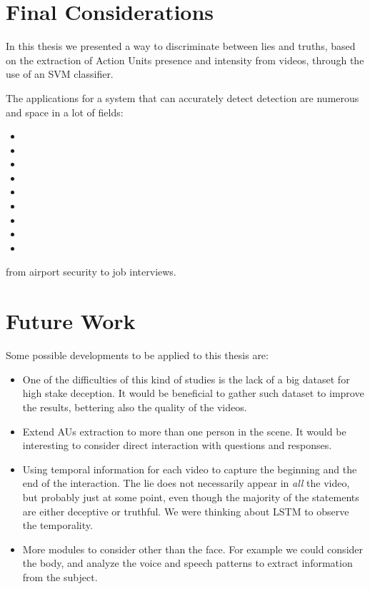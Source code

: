 
\section{Final Considerations}
In this thesis we presented a way to discriminate between lies and truths, based on the extraction of Action Units presence and intensity from videos, through the use of an SVM classifier.

The applications for a system that can accurately detect detection are numerous and space in a lot of fields:
\begin{itemize}
	\item 
	\item 
	\item 
	\item 
	\item 
	\item 
	\item 
	\item 
	\item 
\end{itemize}
 from airport security to job interviews.





\section{Future Work} \label{fw}
Some possible developments to be applied to this thesis are:
\begin{itemize}
	\item One of the difficulties of this kind of studies is the lack of a big dataset for high stake deception. It would be beneficial to gather such dataset to improve the results, bettering also the quality of the videos.
	\item Extend AUs extraction to more than one person in the scene. It would be interesting to consider direct interaction with questions and responses. 
	\item Using temporal information for each video to capture the beginning and the end of the interaction. The lie does not necessarily appear in \textit{all} the video, but probably just at some point, even though the majority of the statements are either deceptive or truthful. We were thinking about LSTM to observe the temporality.
	\item More modules to consider other than the face. For example we could consider the body, and analyze the voice and speech patterns to extract information from the subject.
\end{itemize}